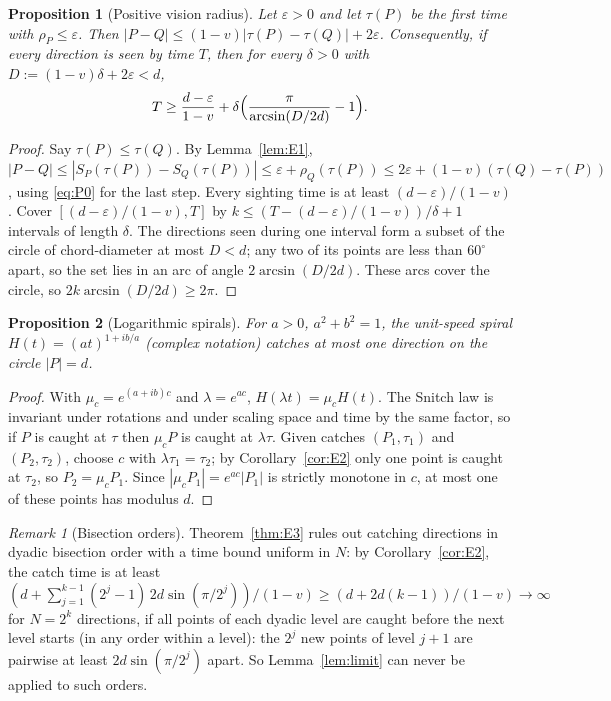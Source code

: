 \documentclass[11pt]{article}
\newtheorem{proposition}{Proposition}
\theoremstyle{remark}\newtheorem{remark}{Remark}
\begin{document}
\begin{proposition}[Positive vision radius]\label{prop:E3eps}
Let $\varepsilon>0$ and let $\tau(P)$ be the first time with $\rho_P\le\varepsilon$. Then $|P-Q|\le(1-v)|\tau(P)-\tau(Q)|+2\varepsilon$.
Consequently, if every direction is seen by time $T$, then for every $\delta>0$ with $D:=(1-v)\delta+2\varepsilon<d$,
\[
T\ge\frac{d-\varepsilon}{1-v}+\delta\Bigl(\frac{\pi}{\arcsin(D/2d)}-1\Bigr).
\]
\end{proposition}
\begin{proof}
Say $\tau(P)\le\tau(Q)$. By Lemma~\ref{lem:E1}, $|P-Q|\le|S_P(\tau(P))-S_Q(\tau(P))|\le\varepsilon+\rho_Q(\tau(P))\le
2\varepsilon+(1-v)(\tau(Q)-\tau(P))$, using \eqref{eq:P0} for the last step. Every sighting time is at least $(d-\varepsilon)/(1-v)$.
Cover $[(d-\varepsilon)/(1-v),T]$ by $k\le(T-(d-\varepsilon)/(1-v))/\delta+1$ intervals of length $\delta$. The directions seen during one interval
form a subset of the circle of chord-diameter at most $D<d$; any two of its points are less than $60^\circ$ apart, so the set lies in
an arc of angle $2\arcsin(D/2d)$. These arcs cover the circle, so $2k\arcsin(D/2d)\ge2\pi$.
\end{proof}

\begin{proposition}[Logarithmic spirals]\label{prop:E7}
For $a>0$, $a^2+b^2=1$, the unit-speed spiral $H(t)=(at)^{1+ib/a}$ (complex notation) catches at most one direction on the
circle $|P|=d$.
\end{proposition}
\begin{proof}
With $\mu_c=e^{(a+ib)c}$ and $\lambda=e^{ac}$, $H(\lambda t)=\mu_cH(t)$. The Snitch law is invariant under rotations and under
scaling space and time by the same factor, so if $P$ is caught at $\tau$ then $\mu_cP$ is caught at $\lambda\tau$. Given catches
$(P_1,\tau_1)$ and $(P_2,\tau_2)$, choose $c$ with $\lambda\tau_1=\tau_2$; by Corollary~\ref{cor:E2} only one point is caught at $\tau_2$,
so $P_2=\mu_cP_1$. Since $|\mu_cP_1|=e^{ac}|P_1|$ is strictly monotone in $c$, at most one of these points has modulus $d$.
\end{proof}

\begin{remark}[Bisection orders]
Theorem~\ref{thm:E3} rules out catching directions in dyadic bisection order with a time bound uniform in $N$: by
Corollary~\ref{cor:E2}, the catch time is at least $(d+\sum_{j=1}^{k-1}(2^j-1)\,2d\sin(\pi/2^j))/(1-v)\ge(d+2d(k-1))/(1-v)\to\infty$
for $N=2^k$ directions, if all points of each dyadic level are caught before the next level starts (in any order within a
level): the $2^j$ new points of level $j+1$ are pairwise at least $2d\sin(\pi/2^j)$ apart. So Lemma~\ref{lem:limit} can never be
applied to such orders.
\end{remark}
\end{document}
